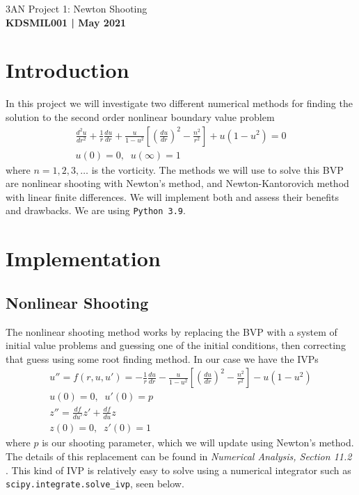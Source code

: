 \documentclass[12pt]{article}
\numberwithin{equation}{section}
\numberwithin{figure}{section}
\numberwithin{table}{section}
\begin{document}
\begin{center}
    {\huge 3AN Project 1: Newton Shooting}\\
    \vspace{0.2in}
    \textbf{KDSMIL001 | May 2021}    
\end{center}

\section{Introduction}\label{sec:Introduction}
In this project we will investigate two different numerical methods for finding the solution to the second order nonlinear boundary value problem
\begin{equation}
\begin{gathered}
    \frac{d^2u}{dr^2}+\frac{1}{r}\frac{du}{dr}+\frac{u}{1-u^2}\left[\left(\frac{du}{dr}\right)^2-\frac{n^2}{r^2}\right]+u(1-u^2)=0\\
    u(0)=0, \;\; u(\infty)=1
\end{gathered}
\label{eqn:BVP}
\end{equation}
where $n=1,2,3,\dots$ is the vorticity. The methods we will use to solve this BVP are nonlinear shooting with Newton's method, and Newton-Kantorovich method with linear finite differences. We will implement both and assess their benefits and drawbacks. We are using \texttt{Python 3.9}.

\section{Implementation}\label{sec:Implementation}
\subsection{Nonlinear Shooting}
\par The nonlinear shooting method works by replacing the BVP with a system of initial value problems and guessing one of the initial conditions, then correcting that guess using some root finding method. In our case we have the IVPs 
\begin{equation}
    \begin{gathered}
        u''=f(r,u,u')=-\frac{1}{r}\frac{du}{dr}-\frac{u}{1-u^2}\left[\left(\frac{du}{dr}\right)^2-\frac{n^2}{r^2}\right]-u(1-u^2)\\
        u(0)=0,\;\; u'(0)=p\\
        z''=\frac{df}{du'}z'+\frac{df}{du}z\\
        z(0)=0,\;\; z'(0)=1
    \end{gathered}
    \label{eqn:Nonlinear Shooting IVP}
\end{equation}
where $p$ is our shooting parameter, which we will update using Newton's method. The details of this replacement can be found in \textit{Numerical Analysis, Section 11.2} \cite{burden}. This kind of IVP is relatively easy to solve using a numerical integrator such as \texttt{scipy.integrate.solve\_ivp}, seen below. 
\end{document}
